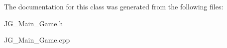 The documentation for this class was generated from the following files\-:\begin{DoxyCompactItemize}
\item 
J\-G\-\_\-\-Main\-\_\-\-Game.\-h\item 
J\-G\-\_\-\-Main\-\_\-\-Game.\-cpp\end{DoxyCompactItemize}
